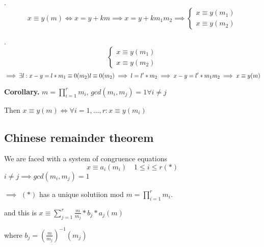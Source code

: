 \ProofForward.
\[
  x \equiv y (m) \iff x = y + km \implies x = y + k m_1 m_2 \implies
  \begin{cases}
    x \equiv y (m_1) \\
    x \equiv y (m_2) 
  \end{cases}
\]

\ProofBackward.
\[
  \begin{cases}
    x \equiv y (m_1) \\
    x \equiv y (m_2) 
  \end{cases}
\]
\[
  \implies \exists l: x-y = l* m_1 \equiv 0 (m_2)\\
  l \equiv 0 (m_2) \implies l = l' * m_2 
    \implies x-y = l'* m_1 m_2
    \implies x \equiv y (m)
\]

\textbf{Corollary.}
$m = \prod_{i=1}^r m_i$, $ gcd(m_i, m_j) = 1 \forall i \neq j$

Then $x \equiv y (m) \iff \forall i = 1, \ldots, r : x \equiv y (m_i)$

\subsection{Chinese remainder theorem}
We are faced with a system of congruence equations
\[
  x \equiv a_i (m_i) \quad 1 \leq i \leq r (*)
\]
$i \neq j \implies gcd(m_i, m_j) = 1$

$\implies$ $(*)$ has a unique solutiion mod $m = \prod_{i = 1}^r m_i$.

and this is $x \equiv \sum_{j=1}^r \frac {m}{m_j} * b_j * a_j (m)$

where $b_j = \left( \frac{m}{m_j} \right) ^{-1} (m_j)$
